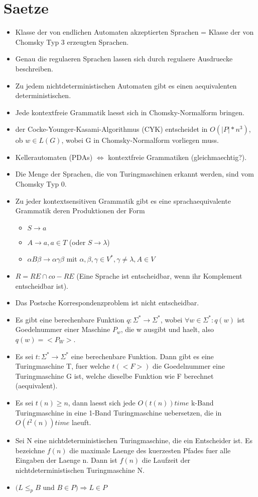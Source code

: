 \documentclass[a4paper]{scrreprt}
\begin{document}
\section{Saetze}

\begin{itemize}
	\item Klasse der von endlichen Automaten akzeptierten Sprachen = Klasse der von Chomsky Typ 3 erzeugten Sprachen.
	\item Genau die regulaeren Sprachen lassen sich durch regulaere Ausdruecke beschreiben.
	\item Zu jedem nichtdeterministischen Automaten gibt es einen aequivalenten deterministischen.
	\item Jede kontextfreie Grammatik laesst sich in Chomsky-Normalform bringen.
	\item der Cocke-Younger-Kasami-Algorithmus (CYK) entscheidet in $O(|P|*n^3)$, ob $w \in L(G)$, wobei G in Chomsky-Normalform vorliegen muss.
	\item Kellerautomaten (PDAs) $\Leftrightarrow$ kontextfreie Grammatiken (gleichmaechtig?).
	\item Die Menge der Sprachen, die von Turingmaschinen erkannt werden, sind vom Chomsky Typ 0.
	\item Zu jeder kontextsensitiven Grammatik gibt es eine sprachaequivalente Grammatik deren Produktionen der Form
		\begin{itemize}
			\item $S \rightarrow a$
			\item $A \rightarrow a, a \in T$ (oder $S \rightarrow \lambda$)
			\item $\alpha B \beta \rightarrow \alpha\gamma\beta$ mit $\alpha,\beta,\gamma \in V^*,\gamma \neq \lambda, A \in V$
		\end{itemize}
	\item $R = RE \cap co-RE$ (Eine Sprache ist entscheidbar, wenn ihr Komplement entscheidbar ist).
	\item Das Postsche Korrespondenzproblem ist nicht entscheidbar.
	\item Es gibt eine berechenbare Funktion $q: \Sigma^* \rightarrow \Sigma^*$, wobei $\forall w \in \Sigma^*: q(w)$ ist Goedelnummer einer Maschine $P_w$, die w ausgibt und haelt, also $q(w) = <P_W>$.
	\item Es sei $t: \Sigma^* \rightarrow \Sigma^*$ eine berechenbare Funktion. Dann gibt es eine Turingmaschine T, fuer welche $t(<F>)$ die Goedelnummer eine Turingmaschine G ist, welche dieselbe Funktion wie F berechnet (aequivalent).
	\item Es sei $t(n) \ge n$, dann laesst sich jede $O(t(n)) time$ k-Band Turingmaschine in eine 1-Band Turingmaschine uebersetzen, die in $O(t^2(n)) time$ laeuft.
	\item Sei N eine nichtdeterministischen Turingmaschine, die ein Entscheider ist. Es bezeichne $f(n)$ die maximale Laenge des kuerzesten Pfades fuer alle Eingaben der Laenge n. Dann ist $f(n)$ die Laufzeit der nichtdeterministischen Turingmaschine N.
	\item $(L \le_p B$ und $B \in P) \Rightarrow L \in P$
\end{itemize}
\end{document}

